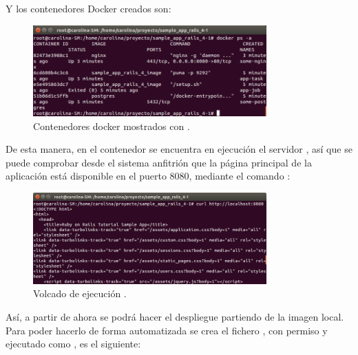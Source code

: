 Y los contenedores Docker creados son:

\begin{figure}[H]
\centering
\includegraphics[width=0.8\textwidth]{images/figures/dockerps.png}
\caption{Contenedores docker mostrados con .}
\end{figure}

De esta manera, en el contenedor  se encuentra en ejecución el servidor , así que se puede comprobar desde el sistema anfitrión que la página principal de la aplicación  está disponible en el puerto 8080, mediante el comando :

\begin{figure}[H]
\centering
\includegraphics[width=0.8\textwidth]{images/figures/curldocker.png}
\caption{Volcado de ejecución .}
\end{figure}

Así, a partir de ahora se podrá hacer el despliegue partiendo de la imagen local. Para poder hacerlo de forma automatizada se crea el fichero , con permiso  y ejecutado como , es el siguiente:

